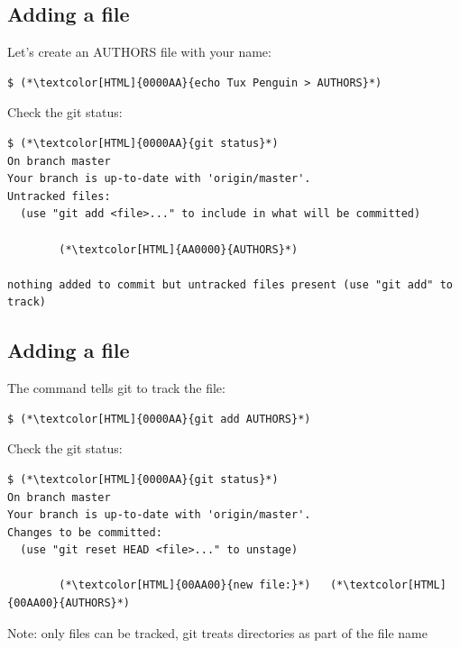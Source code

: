 \subsection{Adding a file}
\begin{frame}[fragile]
  \subslidetitle

  Let's create an AUTHORS file with your name:
  \begin{lstlisting}
$ (*\textcolor[HTML]{0000AA}{echo Tux Penguin > AUTHORS}*)
\end{lstlisting}

  Check the git status:
  \begin{lstlisting}
$ (*\textcolor[HTML]{0000AA}{git status}*)
On branch master
Your branch is up-to-date with 'origin/master'.
Untracked files:
  (use "git add <file>..." to include in what will be committed)

        (*\textcolor[HTML]{AA0000}{AUTHORS}*)

nothing added to commit but untracked files present (use "git add" to track)
\end{lstlisting}

\end{frame}

\subsection{Adding a file}
\begin{frame}[fragile]
  \subslidetitle

  The command  tells git to track the file:
  \begin{lstlisting}
$ (*\textcolor[HTML]{0000AA}{git add AUTHORS}*)
\end{lstlisting}

  Check the git status:
  \begin{lstlisting}
$ (*\textcolor[HTML]{0000AA}{git status}*)
On branch master
Your branch is up-to-date with 'origin/master'.
Changes to be committed:
  (use "git reset HEAD <file>..." to unstage)

        (*\textcolor[HTML]{00AA00}{new file:}*)   (*\textcolor[HTML]{00AA00}{AUTHORS}*)
\end{lstlisting}

  \vspace{1em}
  Note: only files can be tracked, git treats directories as part of the file name
\end{frame}


